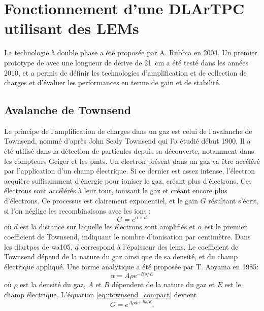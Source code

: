   \section{Fonctionnement d'une DLArTPC utilisant des LEMs}\label{sec::dlartpc}
 
      La technologie à double phase a été proposée par A. Rubbia\cite{Rubbia2004} en 2004. Un premier prototype de \threeL{} avec une longueur de dérive de \SI{21}{\centi\meter} a été testé dans les années 2010, et a permis de définir les technologies d'amplification et de collection de charges\cite{Cantini2013} et d'évaluer les performances en terme de gain et de stabilité\cite{Cantini2014}.

    \subsection{Avalanche de Townsend}\label{sec::townsend}
      
      Le principe de l'amplification de charges dans un gaz est celui de l'avalanche de Townsend, nommé d'après John Sealy Townsend qui l'a étudié début 1900\cite{Townsend1910}. Il a été utilisé dans la détection de particules depuis sa découverte, notamment dans les compteurs Geiger et les \glspl{pmt}. Un électron présent dans un gaz va être accéléré par l'application d'un champ électrique. Si ce dernier est assez intense, l'électron acquière suffisamment d'énergie pour ioniser le gaz, créant plus d'électrons. Ces électrons sont accélérés à leur tour, ionisant le gaz et créant encore plus d'électrons. Ce processus est clairement exponentiel, et le gain $G$ résultant s'écrit, si l'on néglige les recombinaisons avec les ions :
      \begin{equation}\label{eq::townsend_compact}
        G = e^{\alpha\times d}
      \end{equation}
      où $d$ est la distance sur laquelle les électrons sont amplifiés et $\alpha$ est le premier coefficient de Townsend, indiquant le nombre d'ionisation par centimètre. Dans les \glspl{dlartpc} de \gls{wa105}, $d$ correspond à l'épaisseur des \glspl{lem}. Le coefficient de Townsend dépend de la nature du gaz ainsi que de sa densité, et du champ électrique appliqué. Une forme analytique a été proposée par T. Aoyama en 1985\cite{Aoyama1985}:
      \begin{equation}\label{eq::townsend_coef}
        \alpha = A\rho e^{-B\rho/E}
      \end{equation}
      où $\rho$ est la densité du gaz, $A$ et $B$ dépendent de la nature du gaz et $E$ est le champ électrique. L'équation \eqref{eq::townsend_compact} devient
      \begin{equation}\label{eq::townsend}
        G = e^{A\rho  de^{-B\rho /E}}.
      \end{equation}

